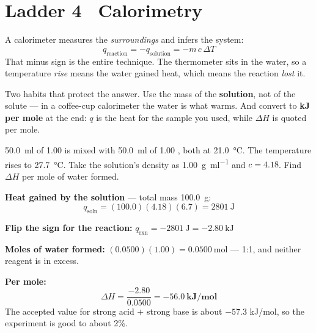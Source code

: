 \documentclass{apchem-worksheet}
\begin{document}
\section*{\sffamily Ladder 4 \textbullet\ Calorimetry}

A calorimeter measures the \emph{surroundings} and infers the system:
\[ q_{\text{reaction}} = -q_{\text{solution}}
   = -m\,c\,\Delta T \]
That minus sign is the entire technique. The thermometer sits in the
water, so a temperature \emph{rise} means the water gained heat, which
means the reaction \emph{lost} it.

\begin{apctrap}
Two habits that protect the answer. Use the mass of the
\textbf{solution}, not of the solute --- in a coffee-cup calorimeter the
water is what warms. And convert to \textbf{kJ per mole} at the end:
$q$ is the heat for the sample you used, while $\Delta H$ is quoted per
mole.
\end{apctrap}

\begin{workedexample}
\SI{50.0}{\milli\litre} of \SI{1.00}{\Molar}  is mixed with
\SI{50.0}{\milli\litre} of \SI{1.00}{\Molar} , both at
\SI{21.0}{\celsius}. The temperature rises to \SI{27.7}{\celsius}. Take
the solution's density as \SI{1.00}{\gram\per\milli\litre} and
$c = 4.18$. Find $\Delta H$ per mole of water formed.

\textbf{Heat gained by the solution} --- total mass \SI{100.0}{\gram}:
\[ q_{\text{soln}} = (100.0)(4.18)(6.7) = \SI{2801}{\joule} \]

\textbf{Flip the sign for the reaction:}
$q_{\text{rxn}} = \SI{-2801}{\joule} = \SI{-2.80}{\kilo\joule}$

\textbf{Moles of water formed:}
$(0.0500)(1.00) = \SI{0.0500}{\mole}$ --- 1:1, and neither reagent is in
excess.

\textbf{Per mole:}
\[ \Delta H = \frac{-2.80}{0.0500} = \mathbf{-56.0~kJ/mol} \]
The accepted value for strong acid $+$ strong base is about
$-57.3$ kJ/mol, so the experiment is good to about 2\%.
\end{workedexample}
\end{document}
